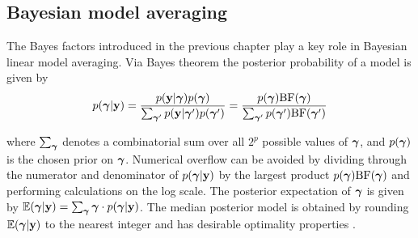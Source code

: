 





\subsection{Bayesian model averaging}


The Bayes factors introduced in the previous chapter play a key role in
Bayesian linear model averaging.  Via Bayes theorem the posterior probability
of a model is given by
$$
\displaystyle p({\boldsymbol \gamma}|{\bf y}) = \frac{p({\bf y}|{\boldsymbol \gamma})p({\boldsymbol \gamma})}{\sum_{{\boldsymbol \gamma}'} p({\bf y}|{\boldsymbol \gamma}')p({\boldsymbol \gamma}')} = \frac{p({\boldsymbol \gamma})\mbox{BF}({\boldsymbol \gamma})}{\sum_{{\boldsymbol \gamma}'} p({\boldsymbol \gamma}')\mbox{BF}({\boldsymbol \gamma}')}
$$

\noindent where $\sum_{{\boldsymbol \gamma}}$ denotes a combinatorial sum over all $2^p$
possible values of ${\boldsymbol \gamma}$, and $p({\boldsymbol \gamma})$ is the chosen prior on
${\boldsymbol \gamma}$. Numerical overflow can be avoided by dividing through the numerator
and denominator of $p({\boldsymbol \gamma}|{\bf y})$ by the largest product
$p({\boldsymbol \gamma})\mbox{BF}({\boldsymbol \gamma})$ and performing calculations  on the log scale.
The posterior expectation of ${\boldsymbol \gamma}$ is given by ${\mathbb E}({\boldsymbol \gamma}|{\bf y}) =
\sum_{{\boldsymbol \gamma}} {\boldsymbol \gamma} \cdot p({\boldsymbol \gamma}|{\bf y})$.  The median posterior model  is
obtained by rounding ${\mathbb E}({\boldsymbol \gamma}|{\bf y})$ to the nearest integer and has
desirable optimality properties \citep{Barbieri2004}.
 
